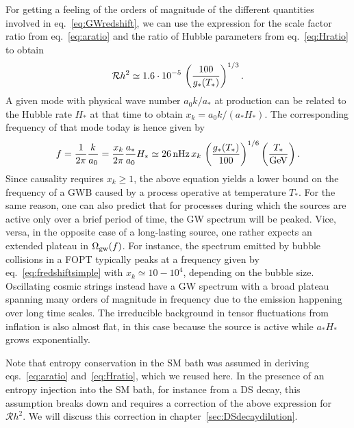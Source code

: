 For getting a feeling of the orders of magnitude of the different quantities involved in eq.~\eqref{eq:GWredshift}, we can use the expression for the scale factor ratio from eq.~\eqref{eq:aratio} and the ratio of Hubble parameters from eq.~\eqref{eq:Hratio} to obtain
\begin{align}
	\mathcal{R}h^2 \simeq 1.6 \cdot 10^{-5} \, \left( \frac{100}{g_*(T_*)} \right)^{1/3} . \label{eq:Rh2simple}
\end{align}
A given mode with physical wave number $a_0 k/ a_*$ at production can be  related to the Hubble rate $H_*$ at that time to obtain $x_k = a_0 k / (a_* H_*)$. The corresponding frequency of that mode today is hence given by
\begin{align}
	f = \frac{1}{2\pi} \frac{k}{a_0} = \frac{x_k}{2\pi} \frac{a_*}{a_0} H_* \simeq 26 \, \text{nHz} \, x_k \, \left( \frac{g_*(T_*)}{100} \right)^{1/6} \left( \frac{T_*}{\text{GeV}} \right) . \label{eq:fredshiftsimple}
\end{align}
Since causality requires $x_k \ge 1$, the above equation yields a lower bound on the frequency of a \ac{GWB} caused by a process operative at temperature $T_*$. For the same reason, one can also predict that for processes during which the sources are active only over a brief period of time, the \ac{GW} spectrum will be peaked. Vice, versa, in the opposite case of a long-lasting source, one  rather expects an extended plateau in $\Omega_{\text{gw}}(f)$. For instance, the spectrum emitted by bubble collisions in a \ac{FOPT} typically peaks at a frequency given by eq.~\eqref{eq:fredshiftsimple} with $x_k \simeq 10 - 10^4$, depending on the bubble size. Oscillating cosmic strings instead have a \ac{GW} spectrum with a broad plateau spanning many orders of magnitude in frequency due to the emission happening over long time scales. The irreducible background in tensor fluctuations from inflation is also almost flat, in this case because the source is active while $a_* H_*$ grows exponentially.

Note that entropy conservation in the \ac{SM} bath was assumed in deriving eqs.~\eqref{eq:aratio} and~\eqref{eq:Hratio}, which we reused here. In the  presence of an entropy injection into the \ac{SM} bath, for instance from a \ac{DS} decay, this assumption breaks down and requires a correction of the above expression for $\mathcal{R}h^2$. We will discuss this correction in chapter~\ref{sec:DSdecaydilution}. 

